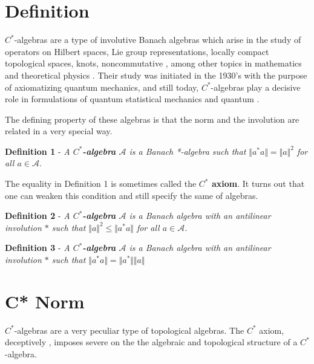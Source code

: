 \documentclass[12pt]{article}
\newcommand*{\norm}[1]{\Vert #1\Vert}
\theoremstyle{inlinedefn}
\theoremstyle{break}
\begin{document}


\section{Definition}

$C^*$-algebras are a type of involutive Banach algebras which arise
in the study of operators on Hilbert spaces, Lie group 
representations, locally compact topological spaces, knots, noncommutative , among other
topics in mathematics and theoretical physics . Their study was initiated in the 1930's with the purpose of axiomatizing  quantum mechanics, and still today, $C^*$-algebras play a decisive role in formulations of quantum statistical mechanics and quantum .

 The defining property of these algebras is
that the norm and the involution are related in a very special way.

{\bf Definition  1} - \emph{A \textbf{$C^*$-algebra} $\mathcal{A}$ is a Banach *-algebra such that
$\norm{a^*a} = \norm{a}^2$ for all $a \in \mathcal{A}$}.

The equality in Definition 1 is sometimes called the {\bf $C^*$ axiom}. It turns out that one can weaken this condition and still specify
the same  of algebras.

{\bf Definition  2} - \emph{A \textbf{$C^*$-algebra} $\mathcal{A}$ is a Banach algebra with an antilinear 
involution $*$ such that $\norm{a}^2 \leq \norm{a^* a}$ for all $a \in \mathcal{A}$.}

{\bf Definition  3} - \emph{A \textbf{$C^*$-algebra} $\mathcal{A}$ is a Banach algebra with an antilinear 
involution $*$ such that $\norm{a^* a} = \norm{a^*}\norm{a}$}


\section{C* Norm}

$C^*$-algebras are a very peculiar type of topological algebras. The $C^*$ axiom, deceptively , imposes severe  on the the algebraic and
 topological structure of a $C^*$-algebra.
\end{document}
